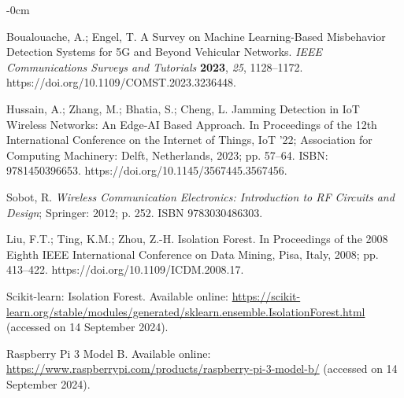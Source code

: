 \documentclass[futureinternet,article,submit,pdftex,moreauthors]{Definitions/mdpi}
\begin{document}
\begin{adjustwidth}{-\extralength}{0cm}
\begin{thebibliography}{999}
Boualouache, A.; Engel, T. A Survey on Machine Learning-Based Misbehavior Detection Systems for 5G and Beyond Vehicular Networks. {\em IEEE Communications Surveys and Tutorials} {\bf 2023}, {\em 25}, 1128--1172. https://doi.org/10.1109/COMST.2023.3236448.

Hussain, A.; Zhang, M.; Bhatia, S.; Cheng, L. Jamming Detection in IoT Wireless Networks: An Edge-AI Based Approach. In Proceedings of the 12th International Conference on the Internet of Things, IoT ’22; Association for Computing Machinery: Delft, Netherlands, 2023; pp. 57--64. ISBN: 9781450396653. https://doi.org/10.1145/3567445.3567456.

Sobot, R. \textit{Wireless Communication Electronics: Introduction to RF Circuits and Design}; Springer: 2012; p. 252. ISBN 9783030486303.

Liu, F.T.; Ting, K.M.; Zhou, Z.-H. Isolation Forest. In Proceedings of the 2008 Eighth IEEE International Conference on Data Mining, Pisa, Italy, 2008; pp. 413--422. https://doi.org/10.1109/ICDM.2008.17.

Scikit-learn: Isolation Forest. Available online: \url{https://scikit-learn.org/stable/modules/generated/sklearn.ensemble.IsolationForest.html} (accessed on 14 September 2024).

Raspberry Pi 3 Model B. Available online: \url{https://www.raspberrypi.com/products/raspberry-pi-3-model-b/} (accessed on 14 September 2024).


\end{thebibliography}

%



\PublishersNote{}
\end{adjustwidth}
\end{document}
